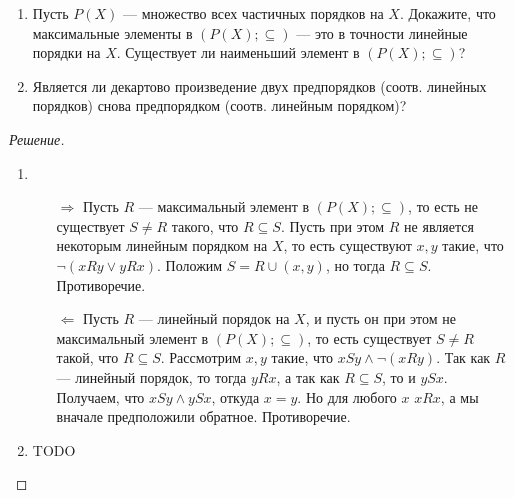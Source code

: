     \begin{problem}[2]
        \begin{enumerate}[label=(\alph{*})]
            \item Пусть \(P(X)\) --- множество всех частичных порядков на \(X\). Докажите, что максимальные элементы в \((P(X); \subseteq)\) --- это в точности линейные порядки на \(X\). Существует ли наименьший элемент в \((P(X); \subseteq)\)?
            \item Является ли декартово произведение двух предпорядков (соотв. линейных порядков) снова предпорядком (соотв. линейным порядком)?
        \end{enumerate}
    \end{problem}
    \begin{proof}[Решение]
        \begin{enumerate}[label=(\alph{*})]
            \item \begin{enumerate}
                \item[\(\Rightarrow\)] Пусть \(R\) --- максимальный элемент в \((P(X); \subseteq)\), то есть не существует \(S \neq R\) такого, что \(R \subseteq S\). Пусть при этом \(R\) не является некоторым линейным порядком на \(X\), то есть существуют \(x, y\) такие, что \(\lnot(xRy \lor yRx)\). Положим \(S = R \cup {(x, y)}\), но тогда \(R \subseteq S\). Противоречие.
                \item[\(\Leftarrow\)] Пусть \(R\) --- линейный порядок на \(X\), и пусть он при этом не максимальный элемент в \((P(X); \subseteq)\), то есть существует \(S \neq R\) такой, что \(R \subseteq S\). Рассмотрим \(x, y\) такие, что \(x S y \land \lnot(x R y)\). Так как \(R\) --- линейный порядок, то тогда \(y R x\), а так как \(R \subseteq S\), то и \(y S x\). Получаем, что \(x S y \land y S x\), откуда \(x = y\). Но для любого \(x\) \(x R x\), а мы вначале предположили обратное. Противоречие.
            \end{enumerate}
            \item TODO
        \end{enumerate}
    \end{proof}

